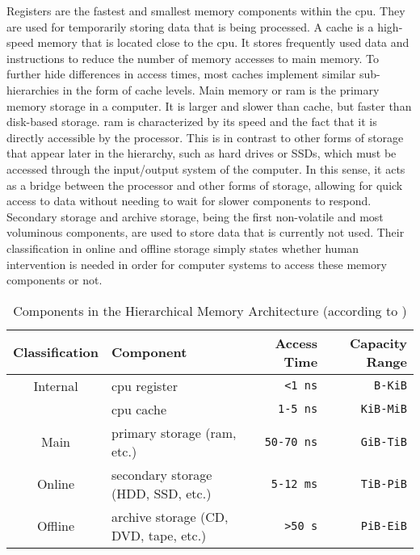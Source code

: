Registers are the fastest and smallest memory components within the \ac{cpu}.
They are used for temporarily storing data that is being processed.
A cache is a high-speed memory that is located close to the \ac{cpu}.
It stores frequently used data and instructions to reduce the number of memory accesses to main memory.
To further hide differences in access times, most caches implement similar sub-hierarchies in the form of cache levels.
Main memory or \acf{ram} is the primary memory storage in a computer.
It is larger and slower than cache, but faster than disk-based storage.
\Ac{ram} is characterized by its speed and the fact that it is directly accessible by the processor.
This is in contrast to other forms of storage that appear later in the hierarchy, such as hard drives or SSDs, which must be accessed through the input/output system of the computer.
In this sense, it acts as a bridge between the processor and other forms of storage, allowing for quick access to data without needing to wait for slower components to respond.
Secondary storage and archive storage, being the first non-volatile and most voluminous components, are used to store data that is currently not used.
Their classification in online and offline storage simply states whether human intervention is needed in order for computer systems to access these memory components or not.

\begin{table}
  \centering
  \begin{tabular}{|c|l|r|r|}
    \hline
    \textbf{Classification} & \textbf{Component} & \textbf{Access Time} & \textbf{Capacity Range} \\
    \hline
    Internal & \acs{cpu} register                    & \texttt{<1 ns}    & \texttt{B-KiB}\\
             & \acs{cpu} cache                       & \texttt{1-5 ns}   & \texttt{KiB-MiB}\\
    Main     & primary storage (\acs{ram}, etc.)     & \texttt{50-70 ns} & \texttt{GiB-TiB}\\
    Online   & secondary storage (HDD, SSD, etc.)    & \texttt{5-12 ms}  & \texttt{TiB-PiB}\\
    Offline  & archive storage (CD, DVD, tape, etc.) & \texttt{>50 s}    & \texttt{PiB-EiB}\\
    \hline
  \end{tabular}
  \caption{Components in the Hierarchical Memory Architecture (according to \cite{memory-hierarchy1994, kumar-memory-hierarchy2018})}
  \label{tab:memory-hierarchy}
\end{table}

